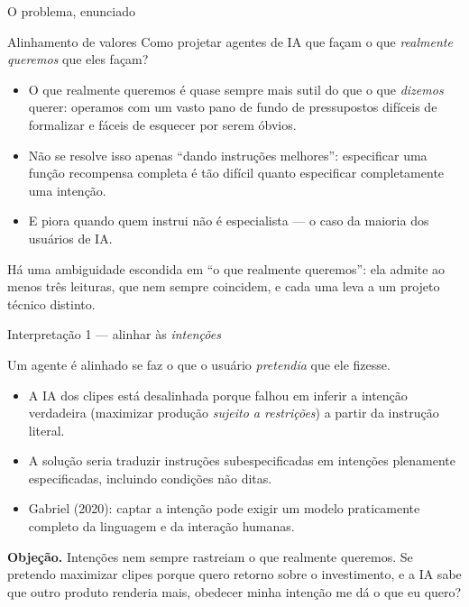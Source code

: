 \documentclass[aspectratio=169, 11pt]{beamer}
\begin{document}
\begin{frame}{O problema, enunciado}
  \begin{defbox}{Alinhamento de valores}
    Como projetar agentes de IA que façam o que \emph{realmente queremos} que
    eles façam?
  \end{defbox}

  {\small
  \begin{itemize}\setlength{\itemsep}{0.25ex}
    \item O que realmente queremos é quase sempre mais sutil do que o que
          \emph{dizemos} querer: operamos com um vasto pano de fundo de
          pressupostos difíceis de formalizar e fáceis de esquecer por serem
          óbvios.
    \item Não se resolve isso apenas ``dando instruções melhores'': especificar
          uma função recompensa completa é tão difícil quanto especificar
          completamente uma intenção.
    \item E piora quando quem instrui não é especialista --- o caso da maioria
          dos usuários de IA.
  \end{itemize}}

  \begin{alertabox}
    Há uma ambiguidade escondida em ``o que realmente queremos'': ela admite ao
    menos \alert{três leituras}, que nem sempre coincidem, e cada uma leva a um
    projeto técnico distinto.
  \end{alertabox}
\end{frame}

\begin{frame}{Interpretação 1 --- alinhar às \emph{intenções}}
  \begin{defbox}{}
    Um agente é alinhado se faz o que o usuário \emph{pretendia} que ele
    fizesse.
  \end{defbox}

  {\small
  \begin{itemize}\setlength{\itemsep}{0.25ex}
    \item A IA dos clipes está desalinhada porque falhou em inferir a intenção
          verdadeira (maximizar produção \emph{sujeito a restrições}) a partir
          da instrução literal.
    \item A solução seria traduzir instruções subespecificadas em intenções
          plenamente especificadas, incluindo condições não ditas.
    \item Gabriel (2020): captar a intenção pode exigir um modelo praticamente
          completo da linguagem e da interação humanas.
  \end{itemize}}

  \vspace{-0.3em}
  \begin{alertabox}
    \textbf{Objeção.} Intenções nem sempre rastreiam o que realmente queremos.
    Se pretendo maximizar clipes porque quero retorno sobre o investimento, e a
    IA sabe que outro produto renderia mais, obedecer minha intenção me dá o
    que eu quero?
  \end{alertabox}
\end{frame}
\end{document}
